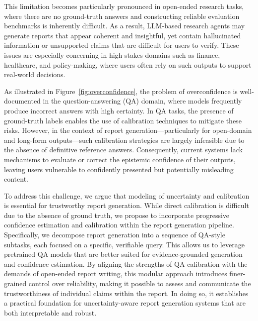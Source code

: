 \documentclass[11pt]{article}
\begin{document}
This limitation becomes particularly pronounced in open-ended research tasks, where there are no ground-truth answers and constructing reliable evaluation benchmarks is inherently difficult. As a result, LLM-based research agents may generate reports that appear coherent and insightful, yet contain hallucinated information or unsupported claims that are difficult for users to verify. These issues are especially concerning in high-stakes domains such as finance, healthcare, and policy-making, where users often rely on such outputs to support real-world decisions.

As illustrated in Figure~\ref{fig:overconfidence}, the problem of overconfidence is well-documented in the question-answering (QA) domain, where models frequently produce incorrect answers with high certainty. In QA tasks, the presence of ground-truth labels enables the use of calibration techniques\cite{luo2025your, yang2023calibration, manggala2024qa} to mitigate these risks. However, in the context of report generation—particularly for open-domain and long-form outputs—such calibration strategies are largely infeasible due to the absence of definitive reference answers. Consequently, current systems lack mechanisms to evaluate or correct the epistemic confidence of their outputs, leaving users vulnerable to confidently presented but potentially misleading content.

To address this challenge, we argue that modeling of uncertainty and calibration is essential for trustworthy report generation. While direct calibration is difficult due to the absence of ground truth, we propose to incorporate progressive confidence estimation and calibration within the report generation pipeline. Specifically, we decompose report generation into a sequence of QA-style subtasks, each focused on a specific, verifiable query. This allows us to leverage pretrained QA models that are better suited for evidence-grounded generation and confidence estimation. By aligning the strengths of QA calibration with the demands of open-ended report writing, this modular approach introduces finer-grained control over reliability, making it possible to assess and communicate the trustworthiness of individual claims within the report. In doing so, it establishes a practical foundation for uncertainty-aware report generation systems that are both interpretable and robust.
\end{document}

